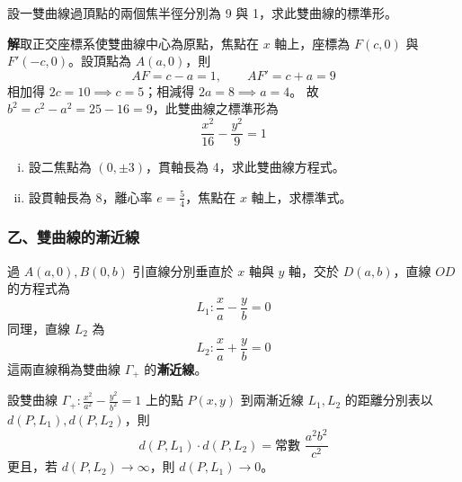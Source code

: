 \begin{example}
設一雙曲線過頂點的兩個焦半徑分別為 9 與 1，求此雙曲線的標準形。

\textbf{解}\quad 取正交座標系使雙曲線中心為原點，焦點在 $x$ 軸上，座標為 $F(c,0)$ 與 $F'(-c,0)$。設頂點為 $A(a,0)$，則
\[ AF = c - a = 1, \qquad AF' = c + a = 9 \]
相加得 $2c = 10 \implies c = 5$；相減得 $2a = 8 \implies a = 4$。
故 $b^2 = c^2 - a^2 = 25 - 16 = 9$，此雙曲線之標準形為
\[ \frac{x^2}{16} - \frac{y^2}{9} = 1 \]
\end{example}

\begin{exercise}
\begin{enumerate}[(i)]
  \item 設二焦點為 $(0, \pm 3)$，貫軸長為 4，求此雙曲線方程式。
  \item 設貫軸長為 8，離心率 $e = \frac{5}{4}$，焦點在 $x$ 軸上，求標準式。
\end{enumerate}
\end{exercise}

\subsubsection*{乙、雙曲線的漸近線}

過 $A(a,0), B(0,b)$ 引直線分別垂直於 $x$ 軸與 $y$ 軸，交於 $D(a,b)$，直線 $OD$ 的方程式為
\[ L_1 : \frac{x}{a} - \frac{y}{b} = 0 \]
同理，直線 $L_2$ 為
\[ L_2 : \frac{x}{a} + \frac{y}{b} = 0 \]
這兩直線稱為雙曲線 $\Gamma_+$ 的\textbf{漸近線}。

\begin{theorem}
設雙曲線 $\Gamma_+ : \frac{x^2}{a^2} - \frac{y^2}{b^2} = 1$ 上的點 $P(x,y)$ 到兩漸近線 $L_1, L_2$ 的距離分別表以 $d(P, L_1), d(P, L_2)$，則
\begin{equation}
d(P, L_1) \cdot d(P, L_2) = \text{常數 } \frac{a^2b^2}{c^2} \label{eq:b4-3-2-3}
\end{equation}
更且，若 $d(P, L_2) \to \infty$，則 $d(P, L_1) \to 0$。
\end{theorem}

